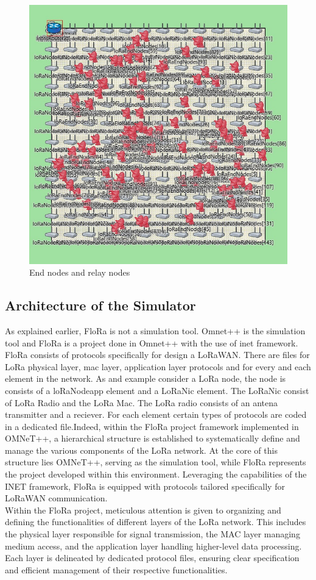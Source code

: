                 \begin{figure}
                \centering
                \includegraphics[width=0.5\columnwidth]{images/Nodes.jpg}
                \caption{End nodes and relay nodes}
                \label{fig:enter-label}
            \end{figure}

\newpage
\subsection{Architecture of the Simulator}
\label{sec:Architecture of the Simulator}

As explained earlier, FloRa is not a simulation tool. Omnet++ is the simulation tool and FloRa is a project done in Omnet++ with the use of inet framework. FloRa consists of protocols specifically for design a LoRaWAN. There are files for LoRa physical layer, mac layer, application layer protocols and for every and each element in the network. As and example consider a LoRa node, the node is consists of a loRaNodeapp element and a LoRaNic element. The LoRaNic consist of LoRa Radio and the LoRa Mac. The LoRa radio consists of an antena transmitter and a reciever. For each element certain types of protocols are coded in a dedicated file.Indeed, within the FloRa project framework implemented in OMNeT++, a hierarchical structure is established to systematically define and manage the various components of the LoRa network. At the core of this structure lies OMNeT++, serving as the simulation tool, while FloRa represents the project developed within this environment. Leveraging the capabilities of the INET framework, FloRa is equipped with protocols tailored specifically for LoRaWAN communication.\\

Within the FloRa project, meticulous attention is given to organizing and defining the functionalities of different layers of the LoRa network. This includes the physical layer responsible for signal transmission, the MAC layer managing medium access, and the application layer handling higher-level data processing. Each layer is delineated by dedicated protocol files, ensuring clear specification and efficient management of their respective functionalities.\\

